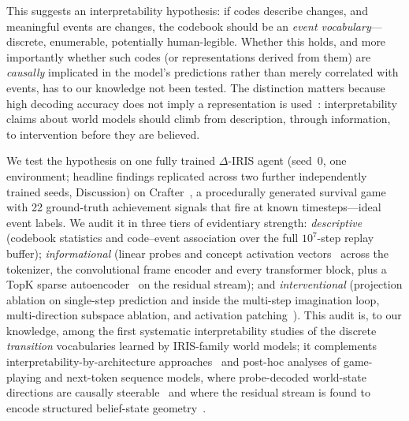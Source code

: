 \documentclass[pdflatex,sn-mathphys-num]{sn-jnl}%
\theoremstyle{thmstyleone}%
\theoremstyle{thmstyletwo}%
\theoremstyle{thmstylethree}%
\newcommand{\deltairis}{$\Delta$-IRIS}
\begin{document}
This suggests an interpretability hypothesis: if codes describe changes, and meaningful events are changes, the codebook should be an \emph{event vocabulary}---discrete, enumerable, potentially human-legible. Whether this holds, and more importantly whether such codes (or representations derived from them) are \emph{causally} implicated in the model's predictions rather than merely correlated with events, has to our knowledge not been tested. The distinction matters because high decoding accuracy does not imply a representation is used~\cite{belinkov2022probing,hewitt2019control,amnesic2021}: interpretability claims about world models should climb from description, through information, to intervention before they are believed.

We test the hypothesis on one fully trained \deltairis{} agent (seed~0, one environment; headline findings replicated across two further independently trained seeds, Discussion) on Crafter~\cite{crafter2022}, a procedurally generated survival game with 22 ground-truth achievement signals that fire at known timesteps---ideal event labels. We audit it in three tiers of evidentiary strength: \emph{descriptive} (codebook statistics and code--event association over the full $10^7$-step replay buffer); \emph{informational} (linear probes and concept activation vectors~\cite{tcav2018} across the tokenizer, the convolutional frame encoder and every transformer block, plus a TopK sparse autoencoder~\cite{gao2024topk,sae2024} on the residual stream); and \emph{interventional} (projection ablation on single-step prediction and inside the multi-step imagination loop, multi-direction subspace ablation, and activation patching~\cite{vig2020causal,rome2022}). This audit is, to our knowledge, among the first systematic interpretability studies of the discrete \emph{transition} vocabularies learned by IRIS-family world models; it complements interpretability-by-architecture approaches~\cite{spartan2025} and post-hoc analyses of game-playing and next-token sequence models, where probe-decoded world-state directions are causally steerable~\cite{li2023othello,nanda2023othello,spies2025maze,butkus2025causal} and where the residual stream is found to encode structured belief-state geometry~\cite{shai2024belief}.
\end{document}
